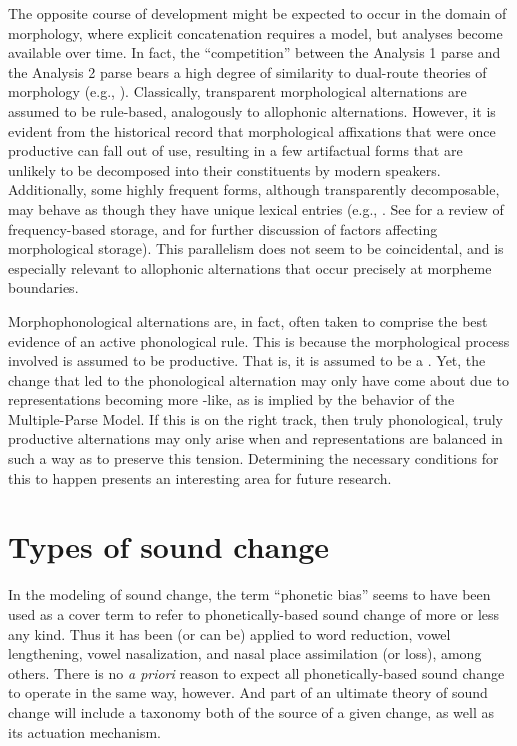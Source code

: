 The opposite course of development might be expected to occur in the
domain of morphology, where explicit concatenation requires a 
model, but  analyses become available over time. In fact,
the “competition” between the Analysis 1 parse and the Analysis
2 parse bears a high degree of similarity to dual-route theories of
morphology (e.g., \citealt{caramazza1988lexical,frauenfelder1992constraining}).
Classically, transparent morphological alternations are assumed to
be rule-based, analogously to allophonic alternations. However, it
is evident from the historical record that morphological affixations
that were once productive can fall out of use, resulting in a few
artifactual forms that are unlikely to be decomposed into their constituents
by modern speakers. Additionally, some highly frequent forms, although
transparently decomposable, may behave as though they have unique
lexical entries (e.g., \citet{baayen1997singulars}. See \citet{levelt1999theory}
for a review of frequency-based storage, and \citet{burani1987representation,baayen1993frequency}
for further discussion of factors affecting morphological storage).
This parallelism does not seem to be coincidental, and is especially
relevant to allophonic alternations that occur precisely at morpheme
boundaries.

Morphophonological alternations are, in fact, often taken to comprise
the best evidence of an active phonological rule. This is because
the morphological process involved is assumed to be productive. That
is, it is assumed to be a . Yet, the change that led
to the phonological alternation may only have come about due to representations
becoming more -like, as is implied by the behavior of
the Multiple-Parse Model. If this is on the right track, then truly
phonological, truly productive alternations may only arise when 
and  representations are balanced in such a way as to
preserve this tension. Determining the necessary conditions for this
to happen presents an interesting area for future research.

\section{Types of sound change}

In the modeling of sound change, the term “phonetic bias” seems
to have been used as a cover term to refer to phonetically-based sound
change of more or less any kind. Thus it has been (or can be) applied
to word reduction, vowel lengthening, vowel nasalization, and nasal
place assimilation (or loss), among others. There is no \emph{a priori}
reason to expect all phonetically-based sound change to operate in
the same way, however. And part of an ultimate theory of sound change
will include a taxonomy both of the source of a given change, as well
as its actuation mechanism. 

